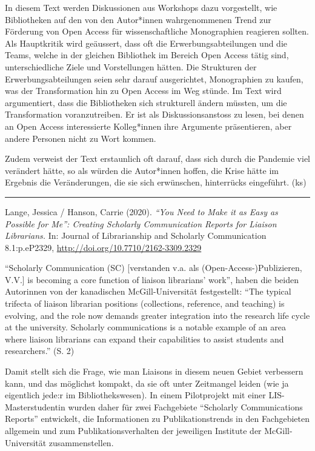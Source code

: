 \documentclass[a4paper,
fontsize=11pt,
oneside,
numbers=noperiodatend,
parskip=half-,
bibliography=totoc,
final
]{scrartcl}
\begin{document}
In diesem Text werden Diskussionen aus Workshops dazu vorgestellt, wie
Bibliotheken auf den von den Autor*innen wahrgenommenen Trend zur
Förderung von Open Access für wissenschaftliche Monographien reagieren
sollten. Als Hauptkritik wird geäussert, dass oft die
Erwerbungsabteilungen und die Teams, welche in der gleichen Bibliothek
im Bereich Open Access tätig sind, unterschiedliche Ziele und
Vorstellungen hätten. Die Strukturen der Erwerbungsabteilungen seien
sehr darauf ausgerichtet, Monographien zu kaufen, was der Transformation
hin zu Open Access im Weg stünde. Im Text wird argumentiert, dass die
Bibliotheken sich strukturell ändern müssten, um die Transformation
voranzutreiben. Er ist als Diskussionsanstoss zu lesen, bei denen an
Open Access interessierte Kolleg*innen ihre Argumente präsentieren, aber
andere Personen nicht zu Wort kommen.

Zudem verweist der Text erstaunlich oft darauf, dass sich durch die
Pandemie viel verändert hätte, so als würden die Autor*innen hoffen, die
Krise hätte im Ergebnis die Veränderungen, die sie sich erwünschen,
hinterrücks eingeführt. (ks)

\begin{center}\rule{0.5\linewidth}{0.5pt}\end{center}

Lange, Jessica / Hanson, Carrie (2020). \emph{\enquote{You Need to Make
it as Easy as Possible for Me}: Creating Scholarly Communication Reports
for Liaison Librarians.} In: Journal of Librarianship and Scholarly
Communication 8.1:p.eP2329, \url{http://doi.org/10.7710/2162-3309.2329}

\enquote{Scholarly Communication (SC) {[}verstanden v.a. als
(Open-Access-)Publizieren, V.V.{]} is becoming a core function of
liaison librarians' work}, haben die beiden Autorinnen von der
kanadischen McGill-Universität festgestellt: \enquote{The typical
trifecta of liaison librarian positions (collections, reference, and
teaching) is evolving, and the role now demands greater integration into
the research life cycle at the university. Scholarly communications is a
notable example of an area where liaison librarians can expand their
capabilities to assist students and researchers.} (S. 2)

Damit stellt sich die Frage, wie man Liaisons in diesem neuen Gebiet
verbessern kann, und das möglichst kompakt, da sie oft unter Zeitmangel
leiden (wie ja eigentlich jede:r im Bibliothekswesen). In einem
Pilotprojekt mit einer LIS-Masterstudentin wurden daher für zwei
Fachgebiete \enquote{Scholarly Communications Reports} entwickelt, die
Informationen zu Publikationstrends in den Fachgebieten allgemein und
zum Publikationsverhalten der jeweiligen Institute der
McGill-Universität zusammenstellen.
\end{document}
